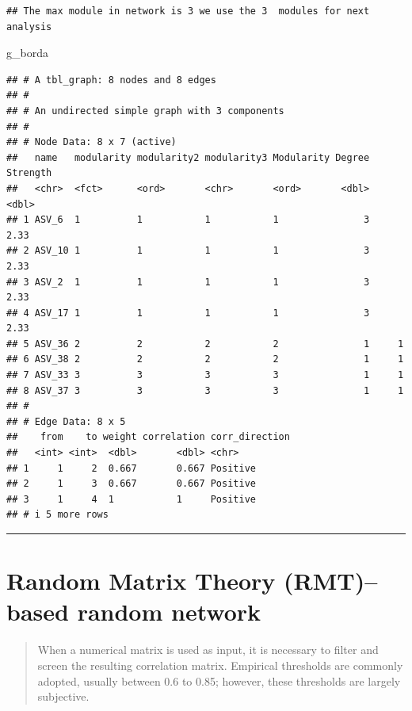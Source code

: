 \documentclass[
]{book}
\newenvironment{Shaded}{\begin{snugshade}}{\end{snugshade}}
\newcommand{\NormalTok}[1]{#1}
\begin{document}
\begin{verbatim}
## The max module in network is 3 we use the 3  modules for next analysis
\end{verbatim}

\begin{Shaded}
\begin{Highlighting}[]
\NormalTok{g\_borda}
\end{Highlighting}
\end{Shaded}

\begin{verbatim}
## # A tbl_graph: 8 nodes and 8 edges
## #
## # An undirected simple graph with 3 components
## #
## # Node Data: 8 x 7 (active)
##   name   modularity modularity2 modularity3 Modularity Degree Strength
##   <chr>  <fct>      <ord>       <chr>       <ord>       <dbl>    <dbl>
## 1 ASV_6  1          1           1           1               3     2.33
## 2 ASV_10 1          1           1           1               3     2.33
## 3 ASV_2  1          1           1           1               3     2.33
## 4 ASV_17 1          1           1           1               3     2.33
## 5 ASV_36 2          2           2           2               1     1   
## 6 ASV_38 2          2           2           2               1     1   
## 7 ASV_33 3          3           3           3               1     1   
## 8 ASV_37 3          3           3           3               1     1   
## #
## # Edge Data: 8 x 5
##    from    to weight correlation corr_direction
##   <int> <int>  <dbl>       <dbl> <chr>         
## 1     1     2  0.667       0.667 Positive      
## 2     1     3  0.667       0.667 Positive      
## 3     1     4  1           1     Positive      
## # i 5 more rows
\end{verbatim}

\begin{center}\rule{0.5\linewidth}{0.5pt}\end{center}

\chapter{Random Matrix Theory (RMT)--based random network}\label{random-matrix-theory-rmtbased-random-network}

\begin{quote}
When a numerical matrix is used as input, it is necessary to filter and screen the resulting correlation matrix. Empirical thresholds are commonly adopted, usually between 0.6 to 0.85; however, these thresholds are largely subjective.
\end{quote}
\end{document}
